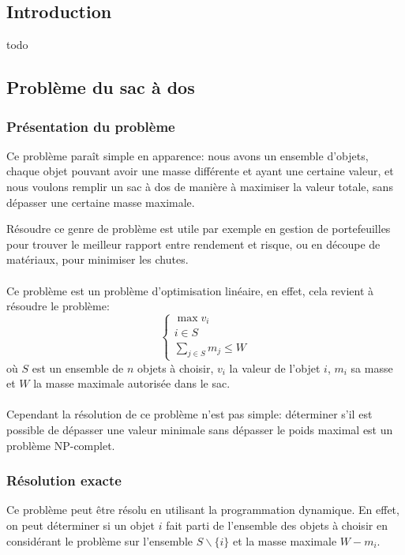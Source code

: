 \subsection{Introduction}
  todo

\subsection{Problème du sac à dos}
  \subsubsection{Présentation du problème}
    Ce problème paraît simple en apparence: nous avons un ensemble d'objets,
    chaque objet pouvant avoir une masse différente et ayant une certaine
    valeur, et nous voulons remplir un sac à dos de manière à maximiser la
    valeur totale, sans dépasser une certaine masse maximale.

    Résoudre ce genre de problème est utile par exemple en gestion de
    portefeuilles pour trouver le meilleur rapport entre rendement et risque,
    ou en découpe de matériaux, pour minimiser les chutes.

    \paragraph{}
    Ce problème est un problème d'optimisation linéaire, en effet, cela revient
    à résoudre le problème:
    \[ \left\{ \begin{array}{l}
        \max v_i \\
        i \in S \\
        \displaystyle\sum_{j \in S} m_j \leq W
      \end{array} \right.
    \]
    où $S$ est un ensemble de $n$ objets à choisir, $v_i$ la valeur de l'objet
    $i$, $m_i$ sa masse et $W$ la masse maximale autorisée dans le sac.

    \paragraph{}
    Cependant la résolution de ce problème n'est pas simple: déterminer s'il
    est possible de dépasser une valeur minimale sans dépasser le poids maximal
    est un problème NP\nobreakdash-complet.

  \subsubsection{Résolution exacte}
    Ce problème peut être résolu en utilisant la programmation dynamique. En
    effet, on peut déterminer si un objet $i$ fait parti de l'ensemble des
    objets à choisir en considérant le problème sur l'ensemble
    $S\backslash\{i\}$ et la masse maximale $W-m_i$.
    
